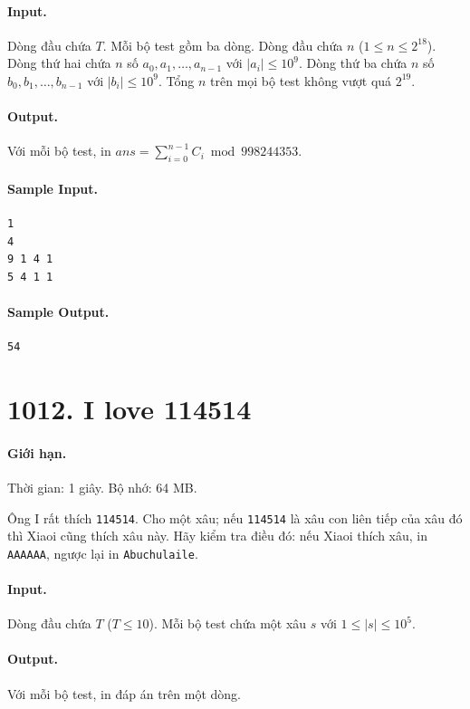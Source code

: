 \documentclass[11pt]{article}
\begin{document}
\paragraph{Input.}
Dòng đầu chứa $T$.  Mỗi bộ test gồm ba dòng.  Dòng đầu chứa $n$
($1\le n\le 2^{18}$).  Dòng thứ hai chứa $n$ số $a_0,a_1,\ldots,a_{n-1}$ với
$|a_i|\le 10^9$.  Dòng thứ ba chứa $n$ số $b_0,b_1,\ldots,b_{n-1}$ với
$|b_i|\le 10^9$.  Tổng $n$ trên mọi bộ test không vượt quá $2^{19}$.

\paragraph{Output.}
Với mỗi bộ test, in
$ans=\sum_{i=0}^{n-1}C_i \bmod 998244353$.

\paragraph{Sample Input.}
\begin{verbatim}
1
4
9 1 4 1
5 4 1 1
\end{verbatim}

\paragraph{Sample Output.}
\begin{verbatim}
54
\end{verbatim}

\section{1012. I love 114514}

\paragraph{Giới hạn.} Thời gian: 1 giây. Bộ nhớ: 64 MB.

Ông I rất thích \texttt{114514}.  Cho một xâu; nếu \texttt{114514} là xâu con
liên tiếp của xâu đó thì Xiaoi cũng thích xâu này.  Hãy kiểm tra điều đó: nếu
Xiaoi thích xâu, in \texttt{AAAAAA}, ngược lại in \texttt{Abuchulaile}.

\paragraph{Input.}
Dòng đầu chứa $T$ ($T\le 10$).  Mỗi bộ test chứa một xâu $s$ với
$1\le |s|\le 10^5$.

\paragraph{Output.}
Với mỗi bộ test, in đáp án trên một dòng.
\end{document}

